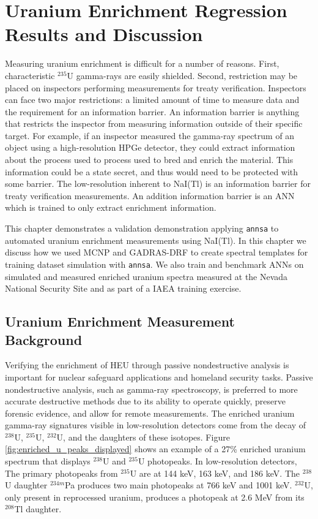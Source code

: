 \chapter[Uranium Enrichment Regression \newline Results and Discussion]{Uranium Enrichment Regression Results and Discussion}


Measuring uranium enrichment is difficult for a number of reasons. First, characteristic $^{235}$U gamma-rays are easily shielded. Second, restriction may be placed on inspectors performing measurements for treaty verification. Inspectors can face two major restrictions: a limited amount of time to measure data and the requirement for an information barrier. An information barrier is anything that restricts the inspector from measuring information outside of their specific target. For example, if an inspector measured the gamma-ray spectrum of an object using a high-resolution HPGe detector, they could extract information about the process used to process used to bred and enrich the material. This information could be a state secret, and thus would need to be protected with some barrier. The low-resolution inherent to NaI(Tl) is an information barrier for treaty verification measurements. An addition information barrier is an ANN which is trained to only extract enrichment information. 

This chapter demonstrates a validation demonstration applying \verb|annsa| to automated uranium enrichment measurements using NaI(Tl). In this chapter we discuss how we used MCNP and GADRAS-DRF to create spectral templates for training dataset simulation with \verb|annsa|. We also train and benchmark ANNs on simulated and measured enriched uranium spectra measured at the Nevada National Security Site and as part of a IAEA training exercise.


\section{Uranium Enrichment Measurement Background}

Verifying the enrichment of HEU through passive nondestructive analysis is important for nuclear safeguard applications and homeland security tasks. Passive nondestructive analysis, such as gamma-ray spectroscopy, is preferred to more accurate destructive methods due to its ability to operate quickly, preserve forensic evidence, and allow for remote measurements. The enriched uranium gamma-ray signatures visible in low-resolution detectors come from the decay of $^{238}$U, $^{235}$U, $^{232}$U, and the daughters of these isotopes. Figure \ref{fig:enriched_u_peaks_displayed} shows an example of a 27\% enriched uranium spectrum that displays $^{238}$U and $^{235}$U photopeaks. In low-resolution detectors, The primary photopeaks from $^{235}$U are at 144 keV, 163 keV, and 186 keV. The $^{238}$U daughter $^{234m}$Pa produces two main photopeaks at 766 keV and 1001 keV. $^{232}$U, only present in reprocessed uranium, produces a photopeak at 2.6 MeV from its $^{208}$Tl daughter.

